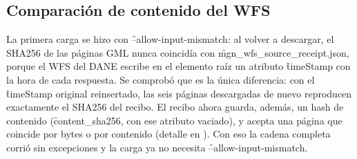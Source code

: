 \subsection{Comparación de contenido del WFS}

La primera carga se hizo con \f{--allow-input-mismatch}: al volver a descargar, el SHA256 de las páginas GML nunca coincidía con \f{mgn\_wfs\_source\_receipt.json}, porque el WFS del DANE escribe en el elemento raíz un atributo \f{timeStamp} con la hora de cada respuesta. Se comprobó que es la única diferencia: con el \f{timeStamp} original reinsertado, las seis páginas descargadas de nuevo reproducen exactamente el SHA256 del recibo. El recibo ahora guarda, además, un hash de contenido (\f{content\_sha256}, con ese atributo vaciado), y  acepta una página que coincide por bytes o por contenido (detalle en ). Con eso la cadena completa corrió sin excepciones y la carga ya no necesita \f{--allow-input-mismatch}.
